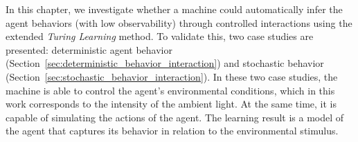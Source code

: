In this chapter, we investigate whether a machine could automatically infer the agent behaviors (with low observability) through controlled interactions using the extended \textit{Turing Learning} method. To validate this, two case studies are presented: deterministic agent behavior (Section~\ref{sec:deterministic_behavior_interaction}) and stochastic behavior (Section~\ref{sec:stochastic_behavior_interaction}). In these two case studies, the machine is able to control the agent's environmental conditions, which in this work corresponds to the intensity of the ambient light. At the same time, it is capable of simulating the actions of the agent. The learning result is a model of the agent that captures its behavior in relation to the environmental stimulus. 


